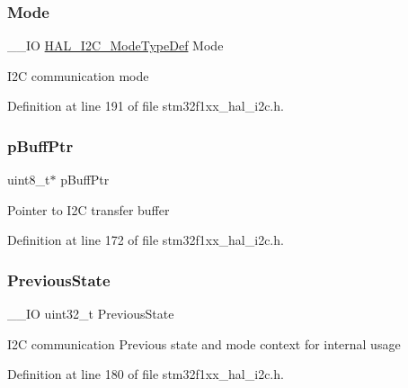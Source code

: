 \mbox{\label{struct_i2_c___handle_type_def_ac25cb640453370e3b2526799dc24eb5a}} 
\subsubsection{\texorpdfstring{Mode}{Mode}}
{\footnotesize\ttfamily \+\_\+\+\_\+\+IO \hyperlink{group___i2_c___exported___types_gabcbb7b844f2ffd63c4e530c117882062}{H\+A\+L\+\_\+\+I2\+C\+\_\+\+Mode\+Type\+Def} Mode}

I2C communication mode 

Definition at line 191 of file stm32f1xx\+\_\+hal\+\_\+i2c.\+h.

\mbox{\label{struct_i2_c___handle_type_def_ae5b117ad14c78eb266b018fb972e315e}} 
\subsubsection{\texorpdfstring{p\+Buff\+Ptr}{pBuffPtr}}
{\footnotesize\ttfamily uint8\+\_\+t$\ast$ p\+Buff\+Ptr}

Pointer to I2C transfer buffer 

Definition at line 172 of file stm32f1xx\+\_\+hal\+\_\+i2c.\+h.

\mbox{\label{struct_i2_c___handle_type_def_aa74abfd1a56073ae8c2c826db1be0628}} 
\subsubsection{\texorpdfstring{Previous\+State}{PreviousState}}
{\footnotesize\ttfamily \+\_\+\+\_\+\+IO uint32\+\_\+t Previous\+State}

I2C communication Previous state and mode context for internal usage 

Definition at line 180 of file stm32f1xx\+\_\+hal\+\_\+i2c.\+h.

